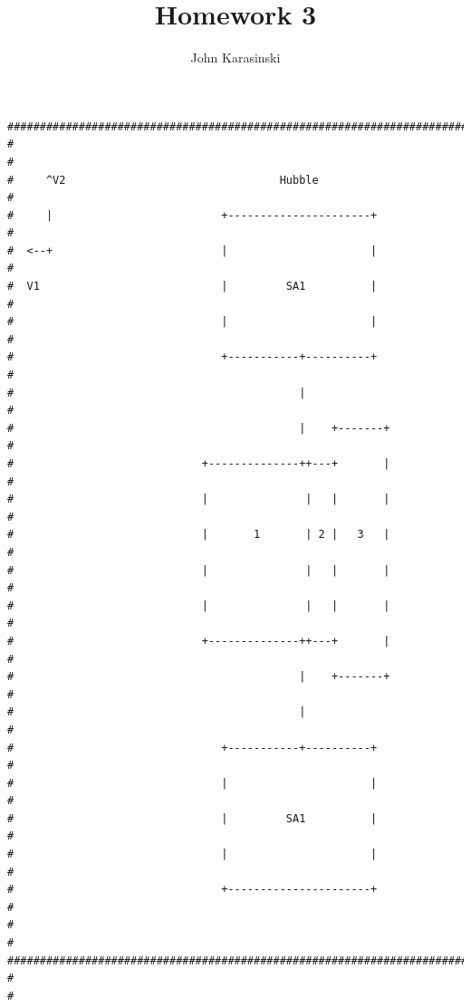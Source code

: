\documentclass[onecolumn,10pt]{jhwhw}
\author{John Karasinski}
\title{Homework 3}
\begin{document}

\begin{lstlisting}
#########################################################################################
#                                                                                       #
#     ^V2                                 Hubble                                        #
#     |                          +----------------------+                               #
#  <--+                          |                      |                               #
#  V1                            |         SA1          |                               #
#                                |                      |                               #
#                                +-----------+----------+                               #
#                                            |                                          #
#                                            |    +-------+                             #
#                             +--------------++---+       |                             #
#                             |               |   |       |                             #
#                             |       1       | 2 |   3   |                             #
#                             |               |   |       |                             #
#                             |               |   |       |                             #
#                             +--------------++---+       |                             #
#                                            |    +-------+                             #
#                                            |                                          #
#                                +-----------+----------+                               #
#                                |                      |                               #
#                                |         SA1          |                               #
#                                |                      |                               #
#                                +----------------------+                               #
#                                                                                       #
#########################################################################################
#                                                                                       #

\end{lstlisting}
\end{document}
